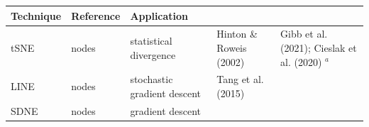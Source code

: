 \documentclass[11pt]{article}
\begin{document}
\begin{longtable}[]{@{}lllll@{}}
\begin{minipage}[b]{0.23\columnwidth}
Technique\strut
\end{minipage} & \begin{minipage}[b]{0.14\columnwidth}\raggedright
Reference\strut
\end{minipage} & \begin{minipage}[b]{0.29\columnwidth}\raggedright
Application\strut
\end{minipage}\tabularnewline
\midrule
\endhead
\begin{minipage}[t]{0.09\columnwidth}\raggedright
tSNE\strut
\end{minipage} & \begin{minipage}[t]{0.11\columnwidth}\raggedright
nodes\strut
\end{minipage} & \begin{minipage}[t]{0.23\columnwidth}\raggedright
statistical divergence\strut
\end{minipage} & \begin{minipage}[t]{0.14\columnwidth}\raggedright
Hinton \& Roweis (2002)\strut
\end{minipage} & \begin{minipage}[t]{0.29\columnwidth}\raggedright
Gibb et al. (2021); Cieslak et al. (2020) \(^a\)\strut
\end{minipage}\tabularnewline
\begin{minipage}[t]{0.09\columnwidth}\raggedright
LINE\strut
\end{minipage} & \begin{minipage}[t]{0.11\columnwidth}\raggedright
nodes\strut
\end{minipage} & \begin{minipage}[t]{0.23\columnwidth}\raggedright
stochastic gradient descent\strut
\end{minipage} & \begin{minipage}[t]{0.14\columnwidth}\raggedright
Tang et al. (2015)\strut
\end{minipage} & \begin{minipage}[t]{0.29\columnwidth}\raggedright
\strut
\end{minipage}\tabularnewline
\begin{minipage}[t]{0.09\columnwidth}\raggedright
SDNE\strut
\end{minipage} & \begin{minipage}[t]{0.11\columnwidth}\raggedright
nodes\strut
\end{minipage} & \begin{minipage}[t]{0.23\columnwidth}\raggedright
gradient descent\strut
\end{minipage} & \begin{minipage}[t]{0.14\columnwidth}\raggedright

\end{minipage}
\end{longtable}
\end{document}
